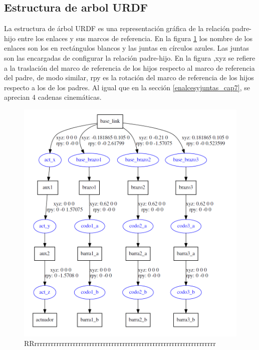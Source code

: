 \newpage

    \subsection{Estructura de arbol URDF}
    La estructura de árbol URDF es una representación gráfica de la relación padre-hijo entre los enlaces y sus marcos de referencia. En la figura \ref{f:cap7_rviz_12341} los nombre de los enlaces son los en rectángulos blancos y las juntas en círculos azules. Las juntas son las encargadas de configurar la relación padre-hijo. En la figura ,xyz se refiere a la traslación del marco de referencia de los hijos respecto al marco de referencia del padre, de modo similar, rpy es la rotación del marco de referencia de los hijos respecto a los de los padres. Al igual que en la sección \ref{enalcesyjuntas_cap7}, se aprecian 4 cadenas cinemáticas.

        \begin{figure}[h]
            \centering
            \includegraphics[width=1.0\linewidth]{Main/Chapter7/Images7/rviz_1.png}
            \caption{RRrrrrrrrrrrrrrrrrrrrrrrrrrrrrrrrrrrrrrrrrrrrrrrrrrrrrrrrrrrrrrrrrrr}
            \label{f:cap7_rviz_12341}
        \end{figure}  
    
